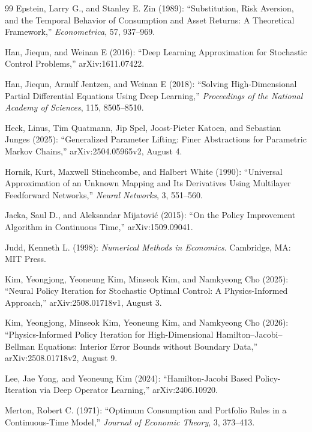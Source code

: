 \begin{thebibliography}{99}
Epstein, Larry G., and Stanley E. Zin (1989): ``Substitution, Risk Aversion, and the Temporal Behavior of Consumption and Asset Returns: A Theoretical Framework,'' \emph{Econometrica}, 57, 937--969.

Han, Jiequn, and Weinan E (2016): ``Deep Learning Approximation for Stochastic Control Problems,'' arXiv:1611.07422.

Han, Jiequn, Arnulf Jentzen, and Weinan E (2018): ``Solving High-Dimensional Partial Differential Equations Using Deep Learning,'' \emph{Proceedings of the National Academy of Sciences}, 115, 8505--8510.

Heck, Linus, Tim Quatmann, Jip Spel, Joost-Pieter Katoen, and Sebastian Junges (2025): ``Generalized Parameter Lifting: Finer Abstractions for Parametric Markov Chains,'' arXiv:2504.05965v2, August 4.

Hornik, Kurt, Maxwell Stinchcombe, and Halbert White (1990): ``Universal Approximation of an Unknown Mapping and Its Derivatives Using Multilayer Feedforward Networks,'' \emph{Neural Networks}, 3, 551--560.

Jacka, Saul D., and Aleksandar Mijatovi\'c (2015): ``On the Policy Improvement Algorithm in Continuous Time,'' arXiv:1509.09041.

Judd, Kenneth L. (1998): \emph{Numerical Methods in Economics}. Cambridge, MA: MIT Press.

Kim, Yeongjong, Yeoneung Kim, Minseok Kim, and Namkyeong Cho (2025): ``Neural Policy Iteration for Stochastic Optimal Control: A Physics-Informed Approach,'' arXiv:2508.01718v1, August 3.

Kim, Yeongjong, Minseok Kim, Yeoneung Kim, and Namkyeong Cho (2026): ``Physics-Informed Policy Iteration for High-Dimensional Hamilton--Jacobi--Bellman Equations: Interior Error Bounds without Boundary Data,'' arXiv:2508.01718v2, August 9.

Lee, Jae Yong, and Yeoneung Kim (2024): ``Hamilton-Jacobi Based Policy-Iteration via Deep Operator Learning,'' arXiv:2406.10920.

Merton, Robert C. (1971): ``Optimum Consumption and Portfolio Rules in a Continuous-Time Model,'' \emph{Journal of Economic Theory}, 3, 373--413.


\end{thebibliography}
